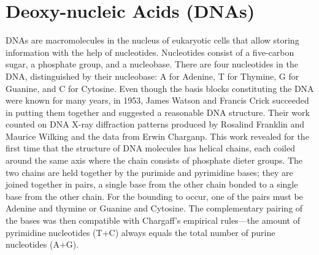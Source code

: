 \section{Deoxy-nucleic Acids (DNAs)}
DNAs are macromolecules in the nucleus of eukaryotic cells that allow storing information with the help of nucleotides. Nucleotides consist of a five-carbon sugar, a phosphate group, and a nucleobase. There are four nucleotides in the DNA, distinguished by their nucleobase: A for Adenine, T for Thymine, G for Guanine, and C for Cytosine. Even though the basis blocks constituting the DNA were known for many years, in 1953, James Watson and Francis Crick \cite{watson1953molecular} succeeded in putting them together and suggested a reasonable DNA structure. Their work counted on DNA X-ray diffraction patterns produced by Rosalind Franklin and Maurice Wilking and the data from Erwin Charganp. This work revealed for the first time that the structure of DNA molecules has helical chains, each coiled around the same axis where the chain consists of phosphate dieter groups. The two chains are held together by the purimide and pyrimidine bases; they are joined together in pairs, a single base from the other chain bonded to a single base from the other chain. For the bounding to occur, one of the pairs must be Adenine and thymine or Guanine and Cytosine. The complementary pairing of the bases was then compatible with Chargaff's empirical rules---the amount of pyrimidine nucleotides (T+C) always equals the total number of purine nucleotides (A+G). 
